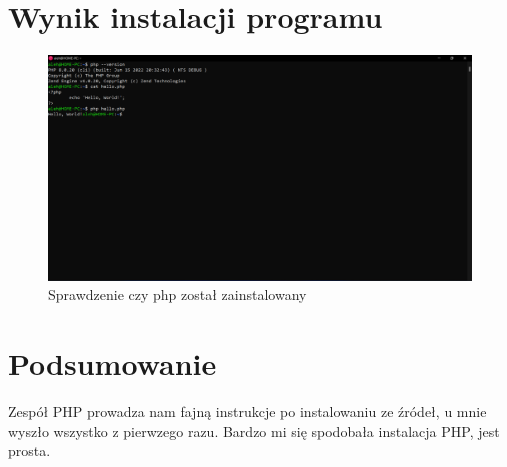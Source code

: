 \documentclass[a4paper,12pt,oneside]{report} %
\begin{document}
\chapter{Wynik instalacji programu}

\begin{figure}[h]
    \includegraphics[width=16cm]{workingProgram.png}
	\caption{Sprawdzenie czy php został zainstalowany}
    \label{fig:eight}
\end{figure}

\chapter{Podsumowanie}

Zespół PHP prowadza nam fajną instrukcje po instalowaniu ze źródeł, u mnie wyszło wszystko z pierwzego razu.
Bardzo mi się spodobała instalacja PHP, jest prosta.
\end{document}
